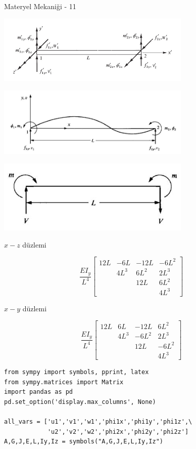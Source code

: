 \documentclass[12pt,fleqn]{article}\usepackage{../../common}
\begin{document}
Materyel Mekaniği - 11


\includegraphics[width=25em]{phy_020_strs_11_01.jpg}

\includegraphics[width=25em]{phy_020_strs_11_02.jpg}

\includegraphics[width=25em]{phy_020_strs_11_03.jpg}


$x-z$ düzlemi

$$
\frac{EI_y}{L^4}
\left[\begin{array}{cccc}
12L & -6L  & -12L & -6L^2 \\
    & 4L^3 & 6L^2 & 2L^3  \\
    &      & 12L  & 6L^2  \\
    &      &      & 4L^3
\end{array}\right]
$$

$x-y$ düzlemi

$$
\frac{EI_y}{L^4}
\left[\begin{array}{cccc}
12L & 6L  & -12L & 6L^2 \\
    & 4L^3 & -6L^2 & 2L^3  \\
    &      & 12L  & -6L^2  \\
    &      &      & 4L^3
\end{array}\right]
$$




\begin{verbatim}
from sympy import symbols, pprint, latex
from sympy.matrices import Matrix
import pandas as pd
pd.set_option('display.max_columns', None)

all_vars = ['u1','v1','w1','phi1x','phi1y','phi1z',\
            'u2','v2','w2','phi2x','phi2y','phi2z']
A,G,J,E,L,Iy,Iz = symbols("A,G,J,E,L,Iy,Iz")
\end{verbatim}
\end{document}
